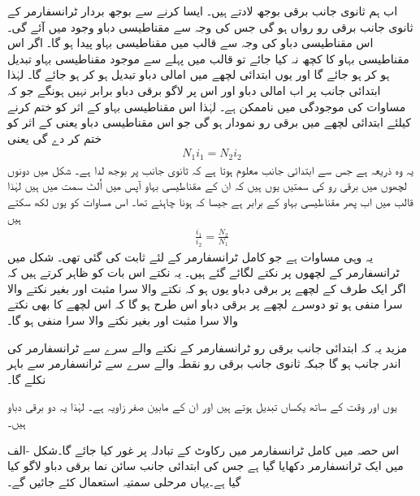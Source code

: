 اب ہم ثانوی جانب  برقی بوجھ لادتے ہیں۔ ایسا کرنے سے بوجھ بردار ٹرانسفارمر  کے  ثانوی جانب  برقی رو  رواں ہو گی جس کی وجہ سے  مقناطیسی دباو وجود میں آئے گی۔ اس مقناطیسی دباو کی وجہ سے قالب میں مقناطیسی بہاو   پیدا ہو گا۔ اگر اس مقناطیسی بہاو کا کچھ  نہ کیا جائے تو قالب میں پہلے سے موجود مقناطیسی بہاو تبدیل ہو کر  ہو جائے گا اور یوں ابتدائی لچھے میں امالی دباو تبدیل ہو کر  ہو جائے گا۔  لہٰذا ابتدائی جانب پر اب امالی دباو اور اس پر لاگو برقی دباو برابر نہیں ہونگے جو کہ مساوات   کی موجودگی میں ناممکن ہے۔ لہٰذا اس مقناطیسی بہاو   کے اثر کو ختم کرنے کیلئے ابتدائی لچھے میں برقی رو  نمودار ہو گی جو اس مقناطیسی دباو یعنی  کے اثر کو ختم کر دے گی یعنی
\begin{align}
N_1 i_1=N_2 i_2
\end{align}
یہ وہ ذریعہ ہے جس سے ابتدائی جانب معلوم ہوتا ہے کہ ثانوی جانب پر بوجھ لدا ہے۔ شکل میں دونوں لچھوں میں برقی رو کی سمتیں یوں ہیں کہ ان کے مقناطیسی بہاو آپس میں اُلٹ سمت میں ہیں لہٰذا  قالب میں اب پھر مقناطیسی بہاو   کے برابر  ہے جیسا کہ ہونا چاہئے تھا۔ اس مساوات کو یوں لکھ سکتے ہیں
\begin{align}\label{مساوات_ٹرانسفارمر_برقی_رو_اور_چکر_شرح}
\frac{i_1}{i_2}=\frac{N_2}{N_1}
\end{align}
یہ وہی مساوات ہے جو کامل ٹرانسفارمر کے لئے ثابت کی گئی تھی۔
%
	شکل   میں ٹرانسفارمر کے لچھوں پر نکتے لگائے گئے ہیں۔ یہ نکتے اس بات کو ظاہر کرتے ہیں کہ اگر ایک طرف کے لچھے پر برقی دباو  یوں ہو کہ نکتے والا سرا مثبت اور بغیر نکتے والا سرا منفی ہو تو دوسرے لچھے  پر برقی دباو  اس طرح ہو گا کہ اس لچھے کا بھی  نکتے والا سرا مثبت اور بغیر نکتے والا سرا منفی ہو گا۔

مزید یہ کہ ابتدائی جانب برقی رو ٹرانسفارمر کے نکتے والے سرے سے ٹرانسفارمر کی اندر جانب ہو گا جبکہ ثانوی جانب برقی رو نقطہ والے سرے سے ٹرانسفارمر سے باہر نکلے گا۔

 یوں   اور  وقت کے ساتھ یکساں تبدیل ہوتے ہیں اور ان کے مابین صفر زاویہ ہے۔ لہٰذا یہ دو برقی دباو  ہیں۔

اس حصہ میں کامل ٹرانسفارمر میں رکاوٹ کے تبادلہ پر غور کیا جائے گا۔شکل -الف میں ایک ٹرانسفارمر دکھایا گیا ہے جس کی ابتدائی جانب سائن نما برقی دباو    لاگو کیا گیا ہے۔یہاں مرحلی سمتیہ استعمال کئے جائیں گے۔

